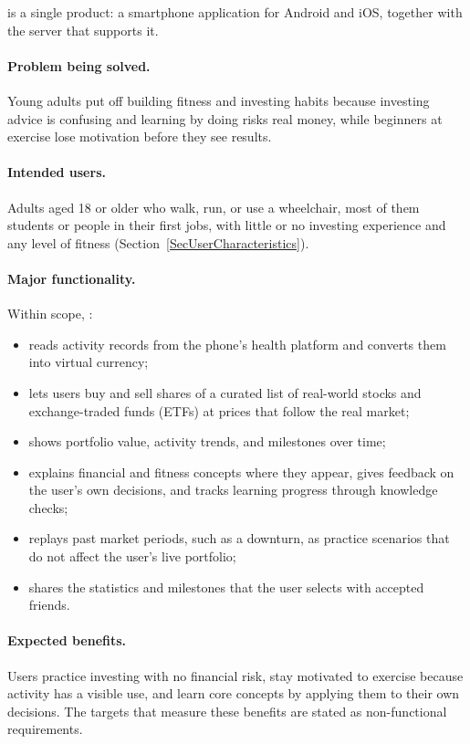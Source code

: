 \documentclass[12pt]{article}
\begin{document}

\progname{} is a single product: a smartphone application for Android and iOS,
together with the server that supports it.

\paragraph{Problem being solved.} Young adults put off building fitness and
investing habits because investing advice is confusing and learning by doing
risks real money, while beginners at exercise lose motivation before they see
results.

\paragraph{Intended users.} Adults aged 18 or older who walk, run, or use a
wheelchair, most of them students or people in their first jobs, with little
or no investing experience and any level of fitness
(Section~\ref{SecUserCharacteristics}).

\paragraph{Major functionality.} Within scope, \progname{}:
\begin{itemize}
  \item reads activity records from the phone's health platform and converts
        them into virtual currency;
  \item lets users buy and sell shares of a curated list of real-world stocks and
        exchange-traded funds (ETFs) at prices that follow the real market;
  \item shows portfolio value, activity trends, and milestones over time;
  \item explains financial and fitness concepts where they appear, gives
        feedback on the user's own decisions, and tracks learning progress through
        knowledge checks;
  \item replays past market periods, such as a downturn, as practice scenarios
        that do not affect the user's live portfolio;
  \item shares the statistics and milestones that the user selects with accepted
        friends.
\end{itemize}

\paragraph{Expected benefits.} Users practice investing with no financial risk,
stay motivated to exercise because activity has a visible use, and learn core
concepts by applying them to their own decisions. The targets that measure
these benefits are stated as non-functional requirements.
\end{document}
